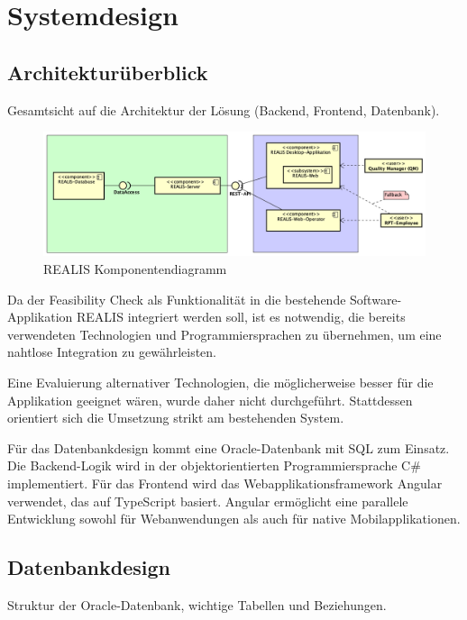 \chapter{Systemdesign}

\section{Architekturüberblick}
Gesamtsicht auf die Architektur der Lösung (Backend, Frontend, Datenbank).

\begin{figure}[!h]
    \centering
    \includegraphics[width=1\textwidth]{bilder/REALIS-Komponentendiagramm.png}
    \caption{REALIS Komponentendiagramm}
    \label{fig:realis-komponentendiagramm}
\end{figure}

Da der Feasibility Check als Funktionalität in die bestehende Software-Applikation \gls{REALIS} integriert werden soll, ist es notwendig, die bereits verwendeten Technologien und Programmiersprachen zu übernehmen, um eine nahtlose Integration zu gewährleisten.

Eine Evaluierung alternativer Technologien, die möglicherweise besser für die Applikation geeignet wären, wurde daher nicht durchgeführt. Stattdessen orientiert sich die Umsetzung strikt am bestehenden System.

Für das Datenbankdesign kommt eine Oracle-Datenbank mit SQL zum Einsatz. Die Backend-Logik wird in der objektorientierten Programmiersprache C\# implementiert. Für das Frontend wird das Webapplikationsframework Angular verwendet, das auf TypeScript basiert. Angular ermöglicht eine parallele Entwicklung sowohl für Webanwendungen als auch für native Mobilapplikationen.

\section{Datenbankdesign}
Struktur der Oracle-Datenbank, wichtige Tabellen und Beziehungen.

